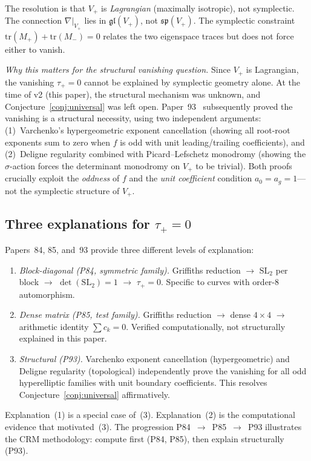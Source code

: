 \documentclass[11pt]{article}
\theoremstyle{plain}
\theoremstyle{definition}
\theoremstyle{remark}
\newcommand{\SL}{\mathrm{SL}}
\newcommand{\tr}{\mathrm{tr}}
\begin{document}
The resolution is that $V_+$ is \emph{Lagrangian} (maximally isotropic),
not symplectic.  The connection $\nabla|_{V_+}$ lies in
$\mathfrak{gl}(V_+)$, not $\mathfrak{sp}(V_+)$.  The symplectic
constraint $\tr(M_+) + \tr(M_-) = 0$ relates the two eigenspace
traces but does not force either to vanish.

\emph{Why this matters for the structural vanishing question.}
Since $V_+$ is Lagrangian, the vanishing $\tau_+ = 0$ cannot be
explained by symplectic geometry alone.  At the time of v2 (this
paper), the structural mechanism was unknown, and
Conjecture~\ref{conj:universal} was left open.  Paper~93~\cite{Lee2026p93}
subsequently proved the vanishing is a structural necessity, using
two independent arguments: (1)~Varchenko's hypergeometric exponent
cancellation (showing all root-root exponents sum to zero when $f$ is
odd with unit leading/trailing coefficients), and (2)~Deligne
regularity combined with Picard--Lefschetz monodromy (showing the
$\sigma$-action forces the determinant monodromy on $V_+$ to be
trivial).  Both proofs crucially exploit the \emph{oddness} of $f$
and the \emph{unit coefficient} condition $a_0 = a_g = 1$---not the
symplectic structure of $V_+$.

\subsection{Three explanations for $\tau_+ = 0$}

Papers~84, 85, and~93 provide three different levels of explanation:

\begin{enumerate}[nosep]
\item \emph{Block-diagonal (P84, symmetric family).} Griffiths
  reduction $\to$ $\SL_2$ per block $\to$ $\det(\SL_2) = 1$
  $\to$ $\tau_+ = 0$.  Specific to curves with order-8 automorphism.
\item \emph{Dense matrix (P85, test family).} Griffiths
  reduction $\to$ dense $4 \times 4$ $\to$ arithmetic identity
  $\sum c_k = 0$.  Verified computationally, not structurally
  explained in this paper.
\item \emph{Structural (P93).} Varchenko exponent cancellation
  (hypergeometric) and Deligne regularity (topological) independently
  prove the vanishing for all odd hyperelliptic families with unit
  boundary coefficients.  This resolves
  Conjecture~\ref{conj:universal} affirmatively.
\end{enumerate}

Explanation~(1) is a special case of~(3).  Explanation~(2) is the
computational evidence that motivated~(3).  The progression
P84~$\to$~P85~$\to$~P93 illustrates the CRM methodology: compute
first (P84, P85), then explain structurally (P93).
\end{document}
